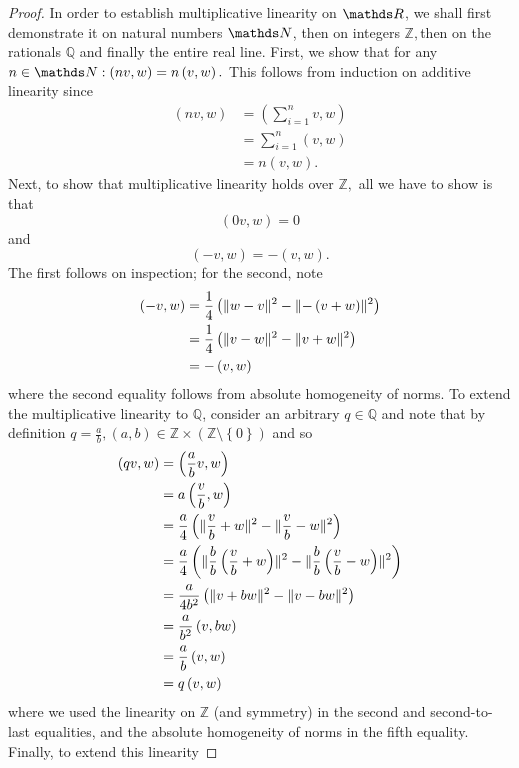 \begin{proof}
In order to establish multiplicative linearity on $\R$, we shall
first demonstrate it on natural numbers $\N$, then on integers $\mathds{Z},$then
on the rationals $\mathds{Q}$ and finally the entire real line. First,
we show that for any $n\in\N:\left(nv,w\right)=n\left(v,w\right).$
This follows from induction on additive linearity since
\begin{align*}
\left(nv,w\right) & =\left(\sum_{i=1}^{n}v,w\right)\\
 & =\sum_{i=1}^{n}\left(v,w\right)\\
 & =n\left(v,w\right).
\end{align*}
Next, to show that multiplicative linearity holds over $\mathds{Z},$
all we have to show is that 
\[
\left(0v,w\right)=0
\]
and
\[
\left(-v,w\right)=-\left(v,w\right).
\]
The first follows on inspection; for the second, note
\begin{align*}
\left(-v,w\right) & =\frac{1}{4}\left(\lVert w-v\rVert_{}^{2}-\lVert-\left(v+w\right)\rVert_{}^{2}\right)\\
 & =\frac{1}{4}\left(\lVert v-w\rVert_{}^{2}-\lVert v+w\rVert_{}^{2}\right)\\
 & =-\left(v,w\right)
\end{align*}
where the second equality follows from absolute homogeneity of norms.
To extend the multiplicative linearity to $\mathds{Q}$, consider
an arbitrary $q\in\mathds{Q}$ and note that by definition $q=\frac{a}{b},\left(a,b\right)\in\mathds{Z}\times\left(\mathds{Z}\setminus\left\{ 0\right\} \right)$
and so
\begin{align*}
\left(qv,w\right) & =\left(\frac{a}{b}v,w\right)\\
 & =a\left(\frac{v}{b},w\right)\\
 & =\frac{a}{4}\left(\lVert\frac{v}{b}+w\rVert_{}^{2}-\lVert\frac{v}{b}-w\rVert_{}^{2}\right)\\
 & =\frac{a}{4}\left(\lVert\frac{b}{b}\left(\frac{v}{b}+w\right)\rVert_{}^{2}-\lVert\frac{b}{b}\left(\frac{v}{b}-w\right)\rVert_{}^{2}\right)\\
 & =\frac{a}{4b^{2}}\left(\lVert v+bw\rVert_{}^{2}-\lVert v-bw\rVert_{}^{2}\right)\\
 & =\frac{a}{b^{2}}\left(v,bw\right)\\
 & =\frac{a}{b}\left(v,w\right)\\
 & =q\left(v,w\right)
\end{align*}
where we used the linearity on $\mathds{Z}$ (and symmetry) in the
second and second-to-last equalities, and the absolute homogeneity
of norms in the fifth equality. Finally, to extend this linearity

\end{proof}
